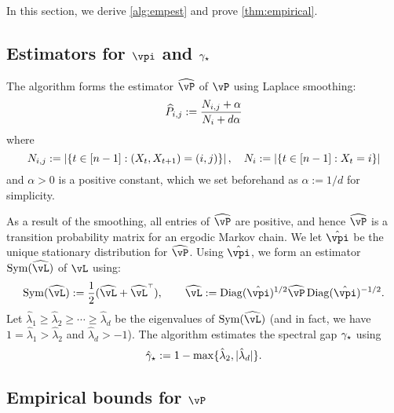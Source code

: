 In this section, we derive \cref{alg:empest} and prove
\cref{thm:empirical}.

\subsection{Estimators for $\vpi$ and $\gamma_{\star}$}

The algorithm forms the estimator $\wh\vP$ of $\vP$ using Laplace smoothing:
\[
  \widehat{P}_{i,j}
  := \frac{N_{i,j} + \alpha}{N_i + d\alpha}
\]
where
\[
  N_{i,j} := \left| \left\{ t \in [n-1] : (X_t,X_{t+1}) = (i,j) \right\} \right| ,
  \quad
  N_i := \left| \left\{ t \in [n-1] : X_t = i \right\} \right|
\]
and $\alpha>0$ is a positive constant, which we set beforehand as $\alpha := 1/d$
for simplicity.

As a result of the smoothing, all entries of $\wh\vP$ are positive,
and hence $\wh\vP$ is a transition probability
matrix for an ergodic Markov chain.
We let $\hat\vpi$ be the unique stationary distribution for $\wh\vP$.
Using $\hat\vpi$, we form an estimator $\Sym(\wh\vL)$ of $\vL$ using:
\[
  \Sym(\wh\vL) := \frac12 \parens{ \wh\vL + \wh\vL^\t }
  ,
  \qquad
  \wh\vL := \Diag(\hat\vpi)^{1/2} \wh\vP \Diag(\hat\vpi)^{-1/2}
  .
\]
Let $\hat\lambda_1 \geq \hat\lambda_2 \geq \dotsb \geq \hat\lambda_d$
be the eigenvalues of $\Sym(\wh\vL)$ (and in fact, we have $1 =
\hat\lambda_1 > \hat\lambda_2$ and $\hat\lambda_d > -1$).
The algorithm estimates the spectral gap $\gamma_{\star}$ using
\[
  \hat\gamma_{\star} := 1 - \max\{ \hat\lambda_2, |\hat\lambda_d| \} .
\]

\subsection{Empirical bounds for $\vP$}
\label{sec:P-obs-bound}

